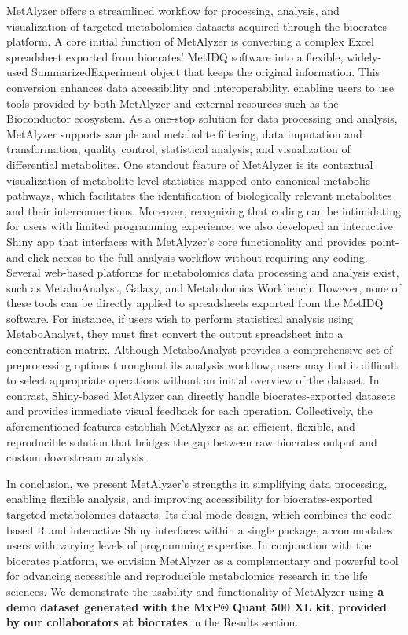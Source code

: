 \documentclass[12pt, a4paper]{article}
\begin{document}
MetAlyzer offers a streamlined workflow for processing, analysis, and visualization of targeted metabolomics datasets acquired through the biocrates platform. A core initial function of MetAlyzer is converting a complex Excel spreadsheet exported from biocrates' MetIDQ software into a flexible, widely-used SummarizedExperiment object\cite{Morgan2022} that keeps the original information. This conversion enhances data accessibility and interoperability, enabling users to use tools provided by both MetAlyzer and external resources such as the Bioconductor ecosystem\cite{Huber2015}. As a one-stop solution for data processing and analysis, MetAlyzer supports sample and metabolite filtering, data imputation and transformation, quality control, statistical analysis, and visualization of differential metabolites. One standout feature of MetAlyzer is its contextual visualization of metabolite-level statistics mapped onto canonical metabolic pathways, which facilitates the identification of biologically relevant metabolites and their interconnections. Moreover, recognizing that coding can be intimidating for users with limited programming experience, we also developed an interactive Shiny app that interfaces with MetAlyzer's core functionality and provides point-and-click access to the full analysis workflow without requiring any coding. Several web-based platforms for metabolomics data processing and analysis exist, such as MetaboAnalyst\cite{Pang2024}, Galaxy\cite{Galaxy2024}, and Metabolomics Workbench\cite{MWB}. However, none of these tools can be directly applied to spreadsheets exported from the MetIDQ software. For instance, if users wish to perform statistical analysis using MetaboAnalyst, they must first convert the output spreadsheet into a concentration matrix. Although MetaboAnalyst provides a comprehensive set of preprocessing options throughout its analysis workflow, users may find it difficult to select appropriate operations without an initial overview of the dataset. In contrast, Shiny-based MetAlyzer can directly handle biocrates-exported datasets and provides immediate visual feedback for each operation. Collectively, the aforementioned features establish MetAlyzer as an efficient, flexible, and reproducible solution that bridges the gap between raw biocrates output and custom downstream analysis.

In conclusion, we present MetAlyzer's strengths in simplifying data processing, enabling flexible analysis, and improving accessibility for biocrates-exported targeted metabolomics datasets. Its dual-mode design, which combines the code-based R and interactive Shiny interfaces within a single package, accommodates users with varying levels of programming expertise. In conjunction with the biocrates platform, we envision MetAlyzer as a complementary and powerful tool for advancing accessible and reproducible metabolomics research in the life sciences. We demonstrate the usability and functionality of MetAlyzer using \textbf{a demo dataset generated with the MxP® Quant 500 XL kit, provided by our collaborators at biocrates} in the Results section.
\end{document}
